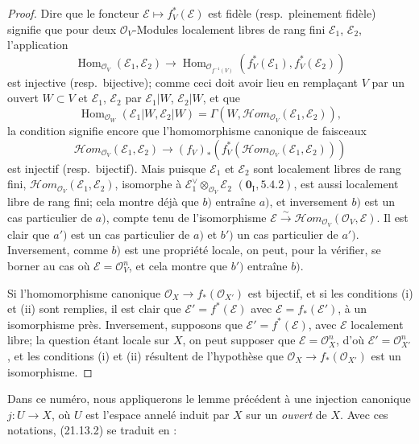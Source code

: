 \begin{proof}
Dire que le foncteur $\mathscr E\mapsto f_V^*(\mathscr E)$ est fidèle
(resp.\ pleinement fidèle) signifie que pour deux $\mathcal O_V$-Modules localement
libres de rang fini $\mathscr E_1$, $\mathscr E_2$, l'application
\[
  \operatorname{Hom}_{\mathcal O_V}(\mathscr E_1,\mathscr E_2)
  \longrightarrow
  \operatorname{Hom}_{\mathcal O_{f^{-1}(V)}}
  (f_V^*(\mathscr E_1),f_V^*(\mathscr E_2))
\]
est injective (resp.\ bijective); comme ceci doit avoir lieu en remplaçant $V$ par un
ouvert $W\subset V$ et $\mathscr E_1$, $\mathscr E_2$ par $\mathscr E_1|W$,
$\mathscr E_2|W$, et que
\[
  \operatorname{Hom}_{\mathcal O_W}(\mathscr E_1|W,\mathscr E_2|W)
  =\Gamma(W,\mathscr Hom_{\mathcal O_V}(\mathscr E_1,\mathscr E_2)),
\]
la condition signifie encore que l'homomorphisme canonique de faisceaux
\[
\label{IV.21.13.2.1}
  \mathscr Hom_{\mathcal O_V}(\mathscr E_1,\mathscr E_2)
  \longrightarrow
  (f_V)_*(f_V^*(\mathscr Hom_{\mathcal O_V}(\mathscr E_1,\mathscr E_2)))
  \tag{21.13.2.1}
\]
est injectif (resp.\ bijectif). Mais puisque $\mathscr E_1$ et $\mathscr E_2$ sont
localement libres de rang fini,
$\mathscr Hom_{\mathcal O_V}(\mathscr E_1,\mathscr E_2)$, isomorphe à
$\mathscr E_1^\vee\otimes_{\mathcal O_V}\mathscr E_2$
$(\mathbf 0_{\mathrm I}, 5.4.2)$, est aussi localement libre de rang fini; cela montre
déjà que $b)$ entraîne $a)$, et inversement $b)$ est un cas particulier de $a)$,
compte tenu de l'isomorphisme
$\mathscr E\xrightarrow{\sim}\mathscr Hom_{\mathcal O_V}(\mathcal O_V,\mathscr E)$.
Il est clair que $a')$ est un cas particulier de $a)$ et $b')$ un cas particulier de
$a')$. Inversement, comme $b)$ est une propriété locale, on peut, pour la vérifier,
se borner au cas où $\mathscr E=\mathcal O_V^n$, et cela montre que $b')$ entraîne
$b)$.

Si l'homomorphisme canonique $\mathcal O_X\to f_*(\mathcal O_{X'})$ est bijectif,
et si les conditions (i) et (ii) sont remplies, il est clair que
$\mathscr E'=f^*(\mathscr E)$ avec $\mathscr E=f_*(\mathscr E')$, à un isomorphisme
près.
Inversement, supposons que $\mathscr E'=f^*(\mathscr E)$, avec $\mathscr E$ localement
libre; la question étant locale sur $X$, on peut supposer que
$\mathscr E=\mathcal O_X^n$, d'où $\mathscr E'=\mathcal O_{X'}^n$, et les conditions
(i) et (ii) résultent de l'hypothèse que
$\mathcal O_X\to f_*(\mathcal O_{X'})$ est un isomorphisme.
\end{proof}

Dans ce numéro, nous appliquerons le lemme précédent à une injection canonique
$j:U\to X$, où $U$ est l'espace annelé induit par $X$ sur un \emph{ouvert} de $X$.
Avec ces notations, (21.13.2) se traduit en :

